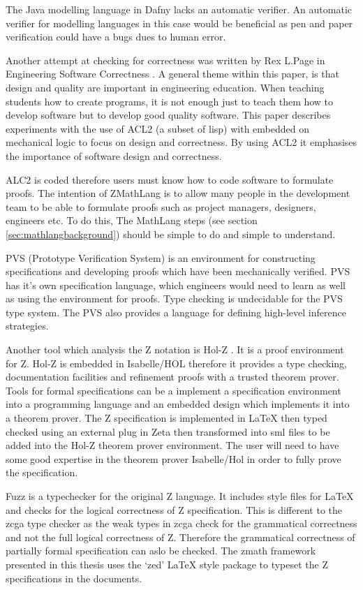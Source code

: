 The Java modelling language in Dafny lacks an automatic verifier. An automatic verifier for modelling languages in this case would be beneficial as pen and paper verification could have a bugs dues to human error.

Another attempt at checking for correctness was written by Rex L.Page in Engineering Software Correctness \cite{engineeringsoftwarecorrectness}. A general theme within this paper, is that design and quality are important in engineering education. When teaching students how to create programs, it is not enough just to teach them how to develop software but to develop good quality software. This paper describes experiments with the use of ACL2 (a subset of lisp) with embedded on mechanical logic to focus on design and correctness. By using ACL2 it emphasises the importance of software design and correctness. 

ALC2 is coded therefore users must know how to code software to formulate proofs. The intention of ZMathLang is to allow many people in the development team to be able to formulate proofs such as project managers, designers, engineers etc. To do this, The MathLang steps (see section \ref{sec:mathlangbackground}) should be simple to do and simple to understand.

PVS (Prototype Verification System) \cite{pvs} is an environment for constructing specifications and developing proofs which have been mechanically verified. PVS has it's own specification language, which engineers would need to learn as well as using the environment for proofs. Type checking is undecidable for the PVS type system. The PVS also provides a language for defining high-level inference strategies.

Another tool which analysis the Z notation is Hol-Z \cite{hol-z}. It is a proof environment for Z. Hol-Z is embedded in Isabelle/HOL therefore it provides a type checking, documentation facilities and refinement proofs with a trusted theorem prover. Tools for formal specifications can be a implement a specification environment into a programming language and an embedded design which implements it into a theorem prover. The Z specification is implemented in \LaTeX{} then typed checked using an external plug in Zeta then transformed into sml files to be added into the Hol-Z theorem prover environment. The user will need to have some good expertise in the theorem prover Isabelle/Hol in order to fully prove the specification.

Fuzz \cite{spiveyfuzz} is a typechecker for the original Z language. It includes style files for \LaTeX{} and checks for the logical correctness of Z specification. This is different to the \gls{zcga} type checker as the weak types in \gls{zcga} check for the grammatical correctness and not the full logical correctness of Z. Therefore the grammatical correctness of partially formal specification can aslo be checked. The \gls{zmath} framework presented in this thesis uses the `zed' \LaTeX{} style package to typeset the Z specifications in the documents.

